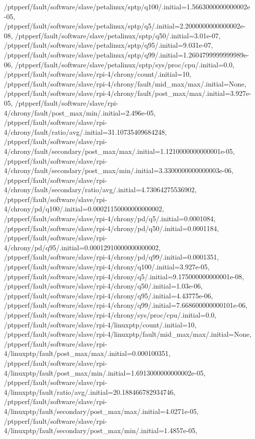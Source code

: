 {    /ptpperf/fault/software/slave/petalinux/sptp/q100/.initial=1.5663000000000002e-05,
    /ptpperf/fault/software/slave/petalinux/sptp/q5/.initial=2.2000000000000002e-08,
    /ptpperf/fault/software/slave/petalinux/sptp/q50/.initial=3.01e-07,
    /ptpperf/fault/software/slave/petalinux/sptp/q95/.initial=9.031e-07,
    /ptpperf/fault/software/slave/petalinux/sptp/q99/.initial=1.2604799999999989e-06,
    /ptpperf/fault/software/slave/petalinux/sptp/sys/proc/cpu/.initial=0.0,
    /ptpperf/fault/software/slave/rpi-4/chrony/count/.initial=10,
    /ptpperf/fault/software/slave/rpi-4/chrony/fault/mid_max/max/.initial=None,
    /ptpperf/fault/software/slave/rpi-4/chrony/fault/post_max/max/.initial=3.927e-05,
    /ptpperf/fault/software/slave/rpi-4/chrony/fault/post_max/min/.initial=2.496e-05,
    /ptpperf/fault/software/slave/rpi-4/chrony/fault/ratio/avg/.initial=31.10735409684248,
    /ptpperf/fault/software/slave/rpi-4/chrony/fault/secondary/post_max/max/.initial=1.1210000000000001e-05,
    /ptpperf/fault/software/slave/rpi-4/chrony/fault/secondary/post_max/min/.initial=3.3300000000000003e-06,
    /ptpperf/fault/software/slave/rpi-4/chrony/fault/secondary/ratio/avg/.initial=4.73064275536902,
    /ptpperf/fault/software/slave/rpi-4/chrony/pd/q100/.initial=0.00021150000000000002,
    /ptpperf/fault/software/slave/rpi-4/chrony/pd/q5/.initial=0.0001084,
    /ptpperf/fault/software/slave/rpi-4/chrony/pd/q50/.initial=0.0001184,
    /ptpperf/fault/software/slave/rpi-4/chrony/pd/q95/.initial=0.00012910000000000002,
    /ptpperf/fault/software/slave/rpi-4/chrony/pd/q99/.initial=0.0001351,
    /ptpperf/fault/software/slave/rpi-4/chrony/q100/.initial=3.927e-05,
    /ptpperf/fault/software/slave/rpi-4/chrony/q5/.initial=9.175000000000001e-08,
    /ptpperf/fault/software/slave/rpi-4/chrony/q50/.initial=1.03e-06,
    /ptpperf/fault/software/slave/rpi-4/chrony/q95/.initial=4.43775e-06,
    /ptpperf/fault/software/slave/rpi-4/chrony/q99/.initial=7.668600000000101e-06,
    /ptpperf/fault/software/slave/rpi-4/chrony/sys/proc/cpu/.initial=0.0,
    /ptpperf/fault/software/slave/rpi-4/linuxptp/count/.initial=10,
    /ptpperf/fault/software/slave/rpi-4/linuxptp/fault/mid_max/max/.initial=None,
    /ptpperf/fault/software/slave/rpi-4/linuxptp/fault/post_max/max/.initial=0.000100351,
    /ptpperf/fault/software/slave/rpi-4/linuxptp/fault/post_max/min/.initial=1.6913000000000002e-05,
    /ptpperf/fault/software/slave/rpi-4/linuxptp/fault/ratio/avg/.initial=20.188466782934746,
    /ptpperf/fault/software/slave/rpi-4/linuxptp/fault/secondary/post_max/max/.initial=4.0271e-05,
    /ptpperf/fault/software/slave/rpi-4/linuxptp/fault/secondary/post_max/min/.initial=1.4857e-05,
}
